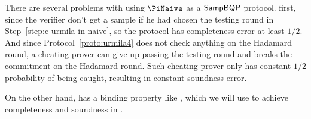 There are several problems with using $\PiNaive$ as a $\operatorname{\mathsf{SampBQP}}$ protocol. first, since the verifier don't get a sample if he had chosen the testing round in Step~\ref{step:c-urmila-in-naive}, so the protocol has  completeness error at least $1/2$. And since Protocol~\ref{proto:urmila4} does not check anything on the Hadamard round, a cheating prover can give up passing the testing round and breaks the commitment on the Hadamard round. Such cheating prover only has constant $1/2$ probability of being caught, resulting in constant soundness error. 




On the other hand,  has a binding property like , which we will use to achieve completeness and soundness in .


